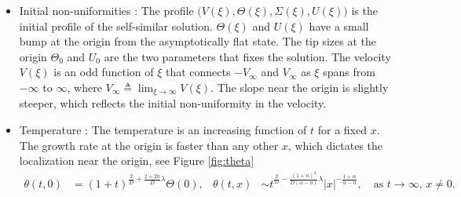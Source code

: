 \documentclass[graybox]{svmult}
\begin{document}
\begin{itemize}
 \item Initial non-uniformities : The profile $\big(V(\xi),\Theta(\xi),\Sigma(\xi),U(\xi)\big)$ is the initial profile of the self-similar solution. $\Theta(\xi)$ and $U(\xi)$ have a small bump at the origin from the asymptotically flat state. The tip sizes at the origin $\Theta_0$ and $U_0$ are the two parameters that fixes the solution. The velocity $V(\xi)$ is an odd function of $\xi$ that connects $-V_\infty$ and $V_\infty$ as $\xi$ spans from $-\infty$ to $\infty$, where $V_\infty \triangleq \lim_{\xi \rightarrow \infty} V(\xi)$. The slope near the origin is slightly steeper, which reflects the initial non-uniformity in the velocity.
\item Temperature : The temperature is an increasing function of $t$ for a fixed $x$. The growth rate at the origin is faster than any other $x$, which dictates the localization near the origin, see Figure \ref{fig:theta}
\begin{align*}
 \theta(t,0) &= (1+t)^{\frac{2}{D} + \frac{2+2n}{D}\lambda}\Theta(0),&
 \theta(t,x) &\sim t^{\frac{2}{D} - \frac{(1+n)^2}{D(\alpha-n)}\lambda}|x|^{-\frac{1+\alpha}{\alpha-n}}, \quad \text{as $t \rightarrow \infty$, $x\ne0$.}
\end{align*}


\end{itemize}
\end{document}
